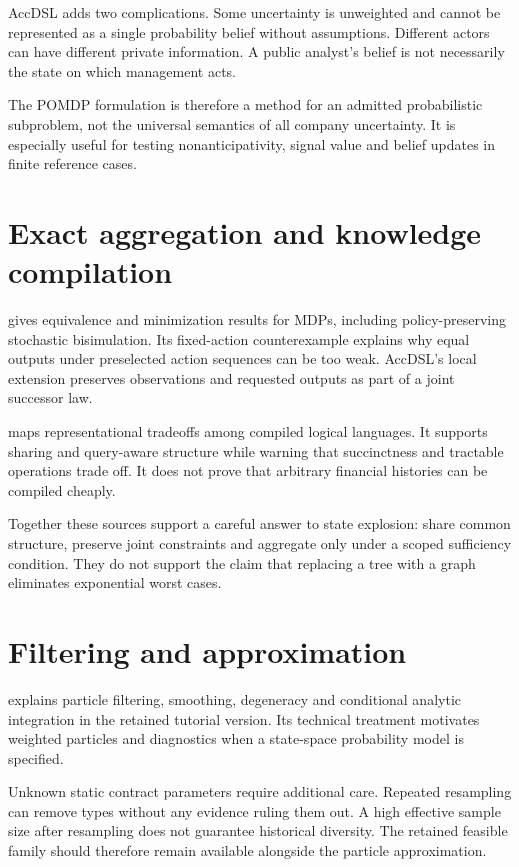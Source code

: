 AccDSL adds two complications. Some uncertainty is unweighted and cannot be represented as a single probability belief without assumptions. Different actors can have different private information. A public analyst's belief is not necessarily the state on which management acts.

The POMDP formulation is therefore a method for an admitted probabilistic subproblem, not the universal semantics of all company uncertainty. It is especially useful for testing nonanticipativity, signal value and belief updates in finite reference cases.

\section{Exact aggregation and knowledge compilation}
\citet{givan2003} gives equivalence and minimization results for MDPs, including policy-preserving stochastic bisimulation. Its fixed-action counterexample explains why equal outputs under preselected action sequences can be too weak. AccDSL's local extension preserves observations and requested outputs as part of a joint successor law.

\citet{darwiche2002} maps representational tradeoffs among compiled logical languages. It supports sharing and query-aware structure while warning that succinctness and tractable operations trade off. It does not prove that arbitrary financial histories can be compiled cheaply.

Together these sources support a careful answer to state explosion: share common structure, preserve joint constraints and aggregate only under a scoped sufficiency condition. They do not support the claim that replacing a tree with a graph eliminates exponential worst cases.

\section{Filtering and approximation}
\citet{doucet2012tutorial} explains particle filtering, smoothing, degeneracy and conditional analytic integration in the retained tutorial version. Its technical treatment motivates weighted particles and diagnostics when a state-space probability model is specified.

Unknown static contract parameters require additional care. Repeated resampling can remove types without any evidence ruling them out. A high effective sample size after resampling does not guarantee historical diversity. The retained feasible family should therefore remain available alongside the particle approximation.

